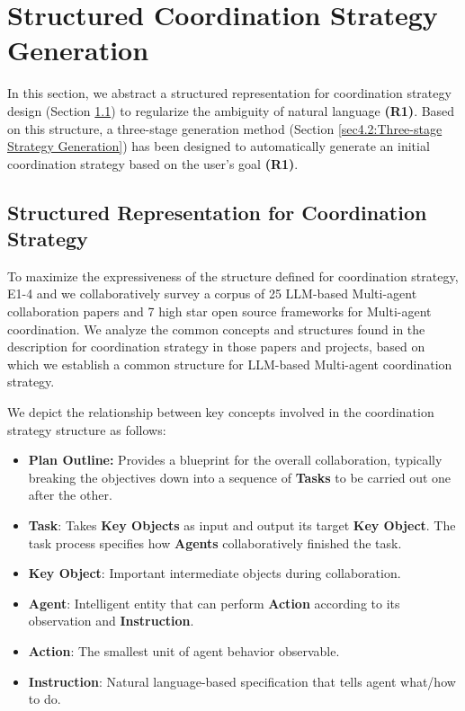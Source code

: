 

\section{Structured Coordination Strategy Generation}
\label{section 4}
In this section, we abstract a structured representation for coordination strategy design (Section \ref{sec4.1:Common Structure for Coordination Strategy}) to regularize the ambiguity of natural language \textbf{(R1)}. Based on this structure, a three-stage generation method (Section \ref{sec4.2:Three-stage Strategy Generation}) has been designed to automatically generate an initial coordination strategy based on the user's goal \textbf{(R1)}.
\subsection{Structured Representation for Coordination Strategy}
\label{sec4.1:Common Structure for Coordination Strategy}
To maximize the expressiveness of the structure defined for coordination strategy, E1-4 and we collaboratively survey a corpus of 25 LLM-based Multi-agent collaboration papers and 7 high star open source frameworks \cite{hong2023metagpt, li2023camel,wu2023autogen,CrewAI,AutoAgents,chetDev,chen2023agentverse} for Multi-agent coordination. We analyze the common concepts and structures found in the description for coordination strategy in those papers and projects, based on which we establish a common structure for LLM-based Multi-agent coordination strategy. 

We depict the relationship between key concepts involved in the coordination strategy structure as follows:

\begin{itemize}

\item \textbf{Plan Outline:} Provides a blueprint for the overall collaboration, typically breaking the objectives down into a sequence of \textbf{Tasks} to be carried out one after the other.

\item \textbf{Task}: Takes \textbf{Key Objects} as input and output its target \textbf{Key Object}. The task process specifies how \textbf{Agents} collaboratively finished the task.

\item \textbf{Key Object}: Important intermediate objects during collaboration. 

\item \textbf{Agent}: Intelligent entity that can perform \textbf{Action} according to its observation and \textbf{Instruction}. 

\item \textbf{Action}: The smallest unit of agent behavior observable.
 
\item \textbf{Instruction}: Natural language-based specification that tells agent what/how to do.

\end{itemize}


